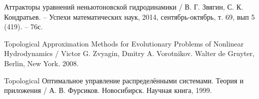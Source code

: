 \begin{thebibliography}{99}

 Аттракторы уравнений неньютоновской гидродинамики / В. Г. Звягин, С. К. Кондратьев. – Успехи математических наук, 2014, сентябрь-октябрь, т. 69, вып 5 (419). – 76с.

 Topological Approximation Methods for Evolutionary Problems of Nonlinear Hydrodynamics / Victor G. Zvyagin, Dmitry A. Vorotnikov. Walter de Gruyter, Berlin, New York. 2008.

 Topological Оптимальное управление распределёнными системами. Теория и приложения / А. В. Фурсиков. Новосибирск. Научная книга, 1999.

\end{thebibliography}


